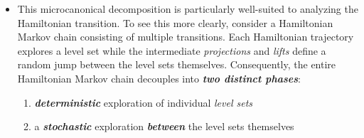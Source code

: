 \documentclass[11pt]{article}
\begin{document}
\begin{itemize}
\item This microcanonical decomposition is particularly well-suited to analyzing the Hamiltonian transition. To see this more clearly, consider a Hamiltonian Markov chain consisting of multiple transitions. Each Hamiltonian trajectory explores a level set while the intermediate \emph{projections} and \emph{lifts} define a random jump between the level sets themselves. Consequently, the entire Hamiltonian Markov chain decouples into \textbf{\emph{two distinct phases}}: 
\begin{enumerate}
\item \emph{\textbf{deterministic}} exploration of individual \emph{level sets}
\item a \emph{\textbf{stochastic}} exploration \emph{\textbf{between}} the level sets themselves 
\end{enumerate}
\end{itemize}
\end{document}
